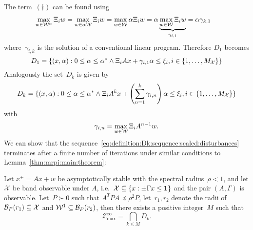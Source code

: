 %
The term~$(\dagger)$ can be found using
%
\begin{equation}
	\begin{aligned}
	\max_{w\in\mathcal W^\alpha}\Xi_iw &= \max_{w\in\alpha\mathcal W} \Xi_iw = \max_{w\in\mathcal W}\alpha\Xi_iw = \alpha\underbrace{\max_{w\in\mathcal W}\Xi_i w}_{\gamma_{i,1}} =\alpha \gamma_{k,1}
	\end{aligned}
\end{equation}
%
where~$\gamma_{i,k}$ is the solution of a conventional linear program.
%
Therefore $D_1$ becomes
%
\begin{equation}
	D_1 = \{(x,\alpha):0\leq\alpha\leq\alpha^\ast\wedge\Xi_iA x + \gamma_{i,1}\alpha\leq\xi_i,i\in\{1,\dots,M_\mathcal X\}\}
\end{equation}
%
Analogously the set~$D_k$ is given by
%
\begin{equation}
	D_k = \{(x,\alpha):0\leq\alpha\leq\alpha^\ast\wedge\Xi_iA^k x + \left(\sum_{n=1}^k\gamma_{i,n}\right)\alpha\leq\xi_i,i\in\{1,\dots,M_\mathcal X\}\}
\end{equation}
%
with
%
\begin{equation}
	\gamma_{i,n} = \max_{w\in\mathcal W}\Xi_iA^{n-1}w.
\end{equation}
%
We can show that the sequence~\eqref{eq:definition:Dk:sequence:scaled:disturbances} terminates after a finite number of iterations under similar conditions to Lemma~\ref{thm:mrpi:main:theorem}:
%
\begin{thm}\label{thm:scaled:distrubances:mrpi}
Let $x^+=Ax+w$ be asymptotically stable with the spectral radius~$\rho<1$, and let $\mathcal X$ be band observable under $A$, i.e.~$\mathcal X\subseteq\{x:\pm\Gamma x\leq \mathbf{1}\}$ and the pair $(A,\Gamma)$ is observable.
%
Let~$P\succ0$ such that $A^TPA\preceq\rho^2P$, let~$r_1,r_2$ denote the radii of $\mathcal B_P(r_1)\subseteq\mathcal X$ and $\mathcal W^1\subseteq\mathcal B_P(r_2)$, then there exists a positive integer~$M$ such that
\[
	\mathcal Z^{\infty}_{\max} = \bigcap_{k\leq M} D_k.
\]
\end{thm}
%
